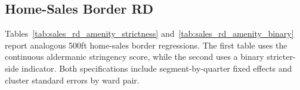 \subsection{Home-Sales Border RD}

Tables~\ref{tab:sales_rd_amenity_strictness} and~\ref{tab:sales_rd_amenity_binary} report analogous 500ft home-sales border regressions. The first table uses the continuous aldermanic stringency score, while the second uses a binary stricter-side indicator. Both specifications include segment-by-quarter fixed effects and cluster standard errors by ward pair.

\begin{table}[H]
    \caption{Home-Sales Border RD: Stringency Score and Amenity Controls}
    \label{tab:sales_rd_amenity_strictness}

    
\end{table}

\begin{table}[H]
    \caption{Home-Sales Border RD: Stricter-Side Indicator and Amenity Controls}
    \label{tab:sales_rd_amenity_binary}

    
\end{table}
